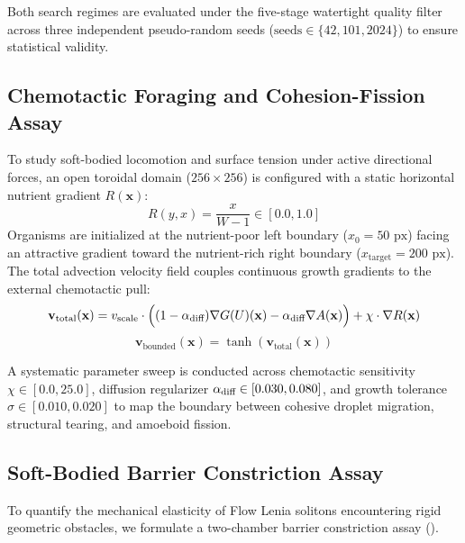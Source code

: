 Both search regimes are evaluated under the five-stage watertight quality filter across three independent pseudo-random seeds ($\text{seeds} \in \{42, 101, 2024\}$) to ensure statistical validity.

\subsection{Chemotactic Foraging and Cohesion-Fission Assay}
\label{subsec:exp_chemotaxis_protocol}

To study soft-bodied locomotion and surface tension under active directional forces, an open toroidal domain ($256 \times 256$) is configured with a static horizontal nutrient gradient $R(\mathbf{x})$:
\begin{equation}
R(y, x) = \frac{x}{W - 1} \in [0.0, 1.0]
\label{eq:chemotaxis_ramp}
\end{equation}
Organisms are initialized at the nutrient-poor left boundary ($x_0 = 50\text{ px}$) facing an attractive gradient toward the nutrient-rich right boundary ($x_{\text{target}} = 200\text{ px}$). The total advection velocity field couples continuous growth gradients to the external chemotactic pull:
\begin{equation}
\mathbf{v}_{\text{total}}(\mathbf{x}) = v_{\text{scale}} \cdot \Big( (1 - \alpha_{\text{diff}}) \nabla G(U)(\mathbf{x}) - \alpha_{\text{diff}} \nabla A(\mathbf{x}) \Big) + \chi \cdot \nabla R(\mathbf{x})
\label{eq:chemotaxis_velocity_coupling}
\end{equation}
\begin{equation}
\mathbf{v}_{\text{bounded}}(\mathbf{x}) = \tanh\left( \mathbf{v}_{\text{total}}(\mathbf{x}) \right)
\label{eq:chemotaxis_velocity_bounded}
\end{equation}

A systematic parameter sweep is conducted across chemotactic sensitivity $\chi \in [0.0, 25.0]$, diffusion regularizer $\alpha_{\text{diff}} \in [0.030, 0.080]$, and growth tolerance $\sigma \in [0.010, 0.020]$ to map the boundary between cohesive droplet migration, structural tearing, and amoeboid fission.

\subsection{Soft-Bodied Barrier Constriction Assay}
\label{subsec:exp_barrier_constriction}

To quantify the mechanical elasticity of Flow Lenia solitons encountering rigid geometric obstacles, we formulate a two-chamber barrier constriction assay ().

